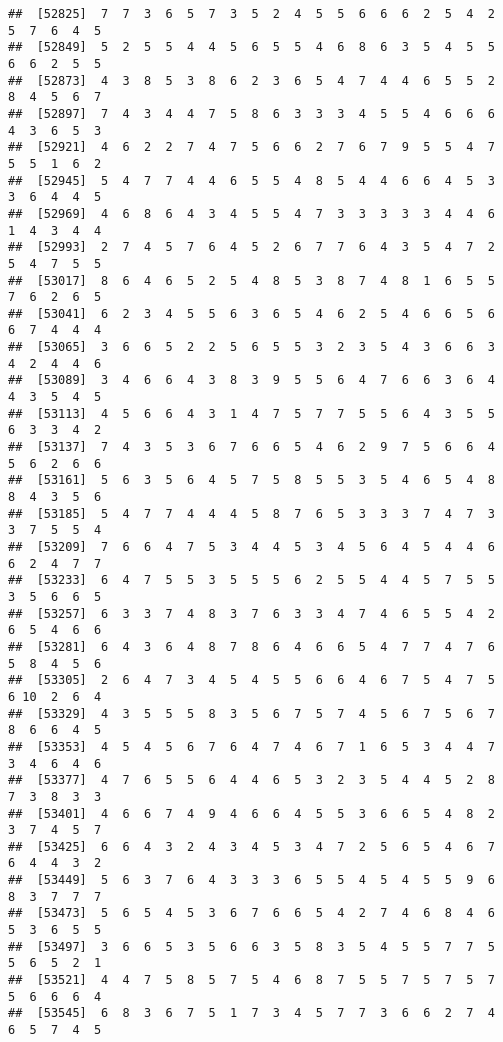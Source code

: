 \documentclass[
]{book}
\begin{document}
\begin{verbatim}
##  [52825]  7  7  3  6  5  7  3  5  2  4  5  5  6  6  6  2  5  4  2  5  7  6  4  5
##  [52849]  5  2  5  5  4  4  5  6  5  5  4  6  8  6  3  5  4  5  5  6  6  2  5  5
##  [52873]  4  3  8  5  3  8  6  2  3  6  5  4  7  4  4  6  5  5  2  8  4  5  6  7
##  [52897]  7  4  3  4  4  7  5  8  6  3  3  3  4  5  5  4  6  6  6  4  3  6  5  3
##  [52921]  4  6  2  2  7  4  7  5  6  6  2  7  6  7  9  5  5  4  7  5  5  1  6  2
##  [52945]  5  4  7  7  4  4  6  5  5  4  8  5  4  4  6  6  4  5  3  3  6  4  4  5
##  [52969]  4  6  8  6  4  3  4  5  5  4  7  3  3  3  3  3  4  4  6  1  4  3  4  4
##  [52993]  2  7  4  5  7  6  4  5  2  6  7  7  6  4  3  5  4  7  2  5  4  7  5  5
##  [53017]  8  6  4  6  5  2  5  4  8  5  3  8  7  4  8  1  6  5  5  7  6  2  6  5
##  [53041]  6  2  3  4  5  5  6  3  6  5  4  6  2  5  4  6  6  5  6  6  7  4  4  4
##  [53065]  3  6  6  5  2  2  5  6  5  5  3  2  3  5  4  3  6  6  3  4  2  4  4  6
##  [53089]  3  4  6  6  4  3  8  3  9  5  5  6  4  7  6  6  3  6  4  4  3  5  4  5
##  [53113]  4  5  6  6  4  3  1  4  7  5  7  7  5  5  6  4  3  5  5  6  3  3  4  2
##  [53137]  7  4  3  5  3  6  7  6  6  5  4  6  2  9  7  5  6  6  4  5  6  2  6  6
##  [53161]  5  6  3  5  6  4  5  7  5  8  5  5  3  5  4  6  5  4  8  8  4  3  5  6
##  [53185]  5  4  7  7  4  4  4  5  8  7  6  5  3  3  3  7  4  7  3  3  7  5  5  4
##  [53209]  7  6  6  4  7  5  3  4  4  5  3  4  5  6  4  5  4  4  6  6  2  4  7  7
##  [53233]  6  4  7  5  5  3  5  5  5  6  2  5  5  4  4  5  7  5  5  3  5  6  6  5
##  [53257]  6  3  3  7  4  8  3  7  6  3  3  4  7  4  6  5  5  4  2  6  5  4  6  6
##  [53281]  6  4  3  6  4  8  7  8  6  4  6  6  5  4  7  7  4  7  6  5  8  4  5  6
##  [53305]  2  6  4  7  3  4  5  4  5  5  6  6  4  6  7  5  4  7  5  6 10  2  6  4
##  [53329]  4  3  5  5  5  8  3  5  6  7  5  7  4  5  6  7  5  6  7  8  6  6  4  5
##  [53353]  4  5  4  5  6  7  6  4  7  4  6  7  1  6  5  3  4  4  7  3  4  6  4  6
##  [53377]  4  7  6  5  5  6  4  4  6  5  3  2  3  5  4  4  5  2  8  7  3  8  3  3
##  [53401]  4  6  6  7  4  9  4  6  6  4  5  5  3  6  6  5  4  8  2  3  7  4  5  7
##  [53425]  6  6  4  3  2  4  3  4  5  3  4  7  2  5  6  5  4  6  7  6  4  4  3  2
##  [53449]  5  6  3  7  6  4  3  3  3  6  5  5  4  5  4  5  5  9  6  8  3  7  7  7
##  [53473]  5  6  5  4  5  3  6  7  6  6  5  4  2  7  4  6  8  4  6  5  3  6  5  5
##  [53497]  3  6  6  5  3  5  6  6  3  5  8  3  5  4  5  5  7  7  5  5  6  5  2  1
##  [53521]  4  4  7  5  8  5  7  5  4  6  8  7  5  5  7  5  7  5  7  5  6  6  6  4
##  [53545]  6  8  3  6  7  5  1  7  3  4  5  7  7  3  6  6  2  7  4  6  5  7  4  5

\end{verbatim}
\end{document}
